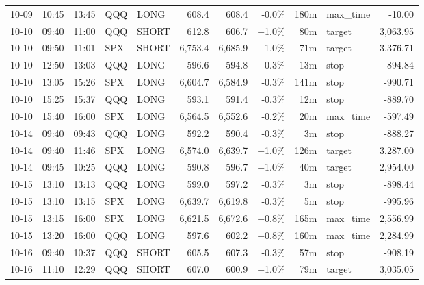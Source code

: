 \documentclass[11pt,a4paper,twoside]{article}
\begin{document}
\begin{center}
\begin{longtable}{>{\color{txtmain}}l l l l l r r r r >{\color{txtmain}}l r}
10-09 & 10:45 & 13:45 & QQQ & LONG & 608.4 & 608.4 & \textcolor{lossred}{-0.0\%} & 180m & max\_time & \textcolor{lossred}{-10.00} \\
10-10 & 09:40 & 11:00 & QQQ & SHORT & 612.8 & 606.7 & \textcolor{wingreen}{+1.0\%} & 80m & target & \textcolor{wingreen}{3,063.95} \\
10-10 & 09:50 & 11:01 & SPX & SHORT & 6,753.4 & 6,685.9 & \textcolor{wingreen}{+1.0\%} & 71m & target & \textcolor{wingreen}{3,376.71} \\
10-10 & 12:50 & 13:03 & QQQ & LONG & 596.6 & 594.8 & \textcolor{lossred}{-0.3\%} & 13m & stop & \textcolor{lossred}{-894.84} \\
10-10 & 13:05 & 15:26 & SPX & LONG & 6,604.7 & 6,584.9 & \textcolor{lossred}{-0.3\%} & 141m & stop & \textcolor{lossred}{-990.71} \\
10-10 & 15:25 & 15:37 & QQQ & LONG & 593.1 & 591.4 & \textcolor{lossred}{-0.3\%} & 12m & stop & \textcolor{lossred}{-889.70} \\
10-10 & 15:40 & 16:00 & SPX & LONG & 6,564.5 & 6,552.6 & \textcolor{lossred}{-0.2\%} & 20m & max\_time & \textcolor{lossred}{-597.49} \\
10-14 & 09:40 & 09:43 & QQQ & LONG & 592.2 & 590.4 & \textcolor{lossred}{-0.3\%} & 3m & stop & \textcolor{lossred}{-888.27} \\
10-14 & 09:40 & 11:46 & SPX & LONG & 6,574.0 & 6,639.7 & \textcolor{wingreen}{+1.0\%} & 126m & target & \textcolor{wingreen}{3,287.00} \\
10-14 & 09:45 & 10:25 & QQQ & LONG & 590.8 & 596.7 & \textcolor{wingreen}{+1.0\%} & 40m & target & \textcolor{wingreen}{2,954.00} \\
10-15 & 13:10 & 13:13 & QQQ & LONG & 599.0 & 597.2 & \textcolor{lossred}{-0.3\%} & 3m & stop & \textcolor{lossred}{-898.44} \\
10-15 & 13:10 & 13:15 & SPX & LONG & 6,639.7 & 6,619.8 & \textcolor{lossred}{-0.3\%} & 5m & stop & \textcolor{lossred}{-995.96} \\
10-15 & 13:15 & 16:00 & SPX & LONG & 6,621.5 & 6,672.6 & \textcolor{wingreen}{+0.8\%} & 165m & max\_time & \textcolor{wingreen}{2,556.99} \\
10-15 & 13:20 & 16:00 & QQQ & LONG & 597.6 & 602.2 & \textcolor{wingreen}{+0.8\%} & 160m & max\_time & \textcolor{wingreen}{2,284.99} \\
10-16 & 09:40 & 10:37 & QQQ & SHORT & 605.5 & 607.3 & \textcolor{lossred}{-0.3\%} & 57m & stop & \textcolor{lossred}{-908.19} \\
10-16 & 11:10 & 12:29 & QQQ & SHORT & 607.0 & 600.9 & \textcolor{wingreen}{+1.0\%} & 79m & target & \textcolor{wingreen}{3,035.05} \\

\end{longtable}
\end{center}
\end{document}
